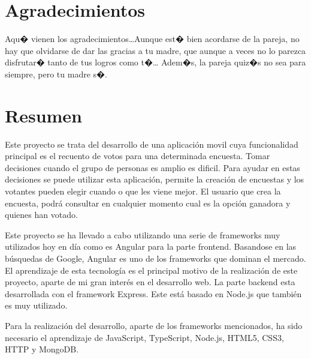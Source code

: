 \documentclass[a4paper, 12pt]{book}
\begin{document}

\chapter*{Agradecimientos}

Aqu� vienen los agradecimientos\ldots Aunque est� bien acordarse de la pareja, no hay que olvidarse de dar las gracias a tu madre, que aunque a veces no lo parezca disfrutar� tanto de tus logros como t�\ldots 
Adem�s, la pareja quiz�s no sea para siempre, pero tu madre s�.


\chapter*{Resumen}

Este proyecto se trata del desarrollo de una aplicaci\'on movil cuya funcionalidad principal es el recuento de votos para una determinada encuesta. Tomar decisiones cuando el grupo de personas es amplio es dificil. Para ayudar en estas decisiones se puede utilizar esta aplicaci\'on, permite la creaci\'on de encuestas y los votantes pueden elegir cuando o que les viene mejor. El usuario que crea la encuesta, podr\'a consultar en cualquier momento cual es la opci\'on ganadora y quienes han votado.

Este proyecto se ha llevado a cabo utilizando una serie de frameworks muy utilizados hoy en d\'ia como es Angular para la parte frontend. Basandose en las b\'usquedas de Google, Angular es uno de los frameworks que dominan el mercado. El aprendizaje de esta tecnolog\'ia es el principal motivo de la realizaci\'on de este proyecto, aparte de mi gran inter\'es en el desarrollo web. La parte backend esta desarrollada con el framework Express. Este est\'a basado en Node.js que tambi\'en es muy utilizado.

Para la realizaci\'on del desarrollo, aparte de los frameworks mencionados, ha sido necesario el aprendizaje de JavaScript, TypeScript, Node.js, HTML5, CSS3, HTTP y MongoDB.
\end{document}
